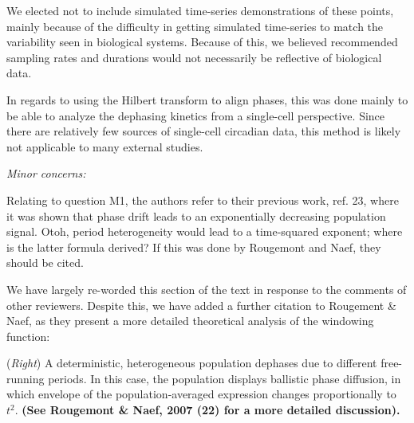 \documentclass[11pt, letterpaper]{article}
\newenvironment{reviewer}{\itshape\color{gray}}{}
\newenvironment{manuscript}[1]{\begin{center}\begin{tcolorbox}[colback=green!5!white,colframe=green!75!black,width=\textwidth,title={#1},breakable,fonttitle=\bfseries]}{\end{tcolorbox}\end{center}}
\begin{document}
We elected not to include simulated time-series demonstrations of these points, mainly because of the difficulty in getting simulated time-series to match the variability seen in biological systems.
Because of this, we believed recommended sampling rates and durations would not necessarily be reflective of biological data.

In regards to using the Hilbert transform to align phases, this was done mainly to be able to analyze the dephasing kinetics from a single-cell perspective.
Since there are relatively few sources of single-cell circadian data, this method is likely not applicable to many external studies.


% 



\begin{reviewer}
Minor concerns:

Relating to question M1, the authors refer to their previous work, ref. 23, where it was shown that phase drift leads to an exponentially decreasing population signal. Otoh, period heterogeneity would lead to a time-squared exponent; where is the latter formula derived? If this was done by Rougemont and Naef, they should be cited.
\end{reviewer}

We have largely re-worded this section of the text in response to the comments of other reviewers. Despite this, we have added a further citation to Rougement \& Naef, as they present a more detailed theoretical analysis of the windowing function:

\begin{manuscript}{Page 16}
   ({\itshape Right}) A deterministic, heterogeneous population dephases due to different free-running periods. In this case, the population displays ballistic phase diffusion, in which envelope of the population-averaged expression changes proportionally to $t^2$. {\bfseries (See Rougemont \& Naef, 2007 (22) for a more detailed discussion).}
\end{manuscript}
\end{document}
